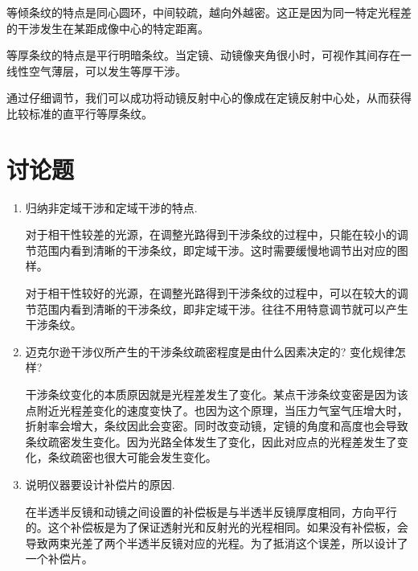 \documentclass[signature=data]{physicsreport}
\begin{document}
\begin{enumerate}
 \hspace{2em}
    等倾条纹的特点是同心圆环，中间较疏，越向外越密。这正是因为同一特定光程差的干涉发生在某距成像中心的特定距离。

     \hspace{2em}
    等厚条纹的特点是平行明暗条纹。当定镜、动镜像夹角很小时，可视作其间存在一线性空气薄层，可以发生等厚干涉。

     \hspace{2em}
通过仔细调节，我们可以成功将动镜反射中心的像成在定镜反射中心处，从而获得比较标准的直平行等厚条纹。

\end{enumerate}


\section{讨论题}
\begin{enumerate}
    \item 归纳非定域干涉和定域干涉的特点.
    
    \hspace{2em}
      对于相干性较差的光源，在调整光路得到干涉条纹的过程中，只能在较小的调节范围内看到清晰的干涉条纹，即定域干涉。这时需要缓慢地调节出对应的图样。

     \hspace{2em}
   对于相干性较好的光源，在调整光路得到干涉条纹的过程中，可以在较大的调节范围内看到清晰的干涉条纹，即非定域干涉。往往不用特意调节就可以产生干涉条纹。
    \item 迈克尔逊干涉仪所产生的干涉条纹疏密程度是由什么因素决定的? 变化规律怎样?

     \hspace{2em}
     干涉条纹变化的本质原因就是光程差发生了变化。某点干涉条纹变密是因为该点附近光程差变化的速度变快了。也因为这个原理，当压力气室气压增大时，折射率会增大，条纹因此会变密。同时改变动镜，定镜的角度和高度也会导致条纹疏密发生变化。因为光路全体发生了变化，因此对应点的光程差发生了变化，条纹疏密也很大可能会发生变化。
    \item 说明仪器要设计补偿片的原因.

     \hspace{2em}
    在半透半反镜和动镜之间设置的补偿板是与半透半反镜厚度相同，方向平行的。这个补偿板是为了保证透射光和反射光的光程相同。如果没有补偿板，会导致两束光差了两个半透半反镜对应的光程。为了抵消这个误差，所以设计了一个补偿片。
\end{enumerate}
\end{document}
